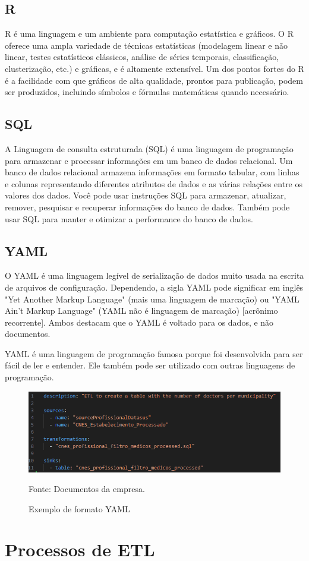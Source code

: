 \subsection{R}

R é uma linguagem e um ambiente para computação estatística e gráficos. O R oferece uma ampla variedade de técnicas estatísticas (modelagem linear e não linear, testes estatísticos clássicos, análise de séries temporais, classificação, clusterização, etc.) e gráficas, e é altamente extensível. Um dos pontos fortes do R é a facilidade com que gráficos de alta qualidade, prontos para publicação, podem ser produzidos, incluindo símbolos e fórmulas matemáticas quando necessário.\cite{r_project_about}

\subsection{SQL}

A Linguagem de consulta estruturada (SQL) é uma linguagem de programação para armazenar e processar informações em um banco de dados relacional. Um banco de dados relacional armazena informações em formato tabular, com linhas e colunas representando diferentes atributos de dados e as várias relações entre os valores dos dados. Você pode usar instruções SQL para armazenar, atualizar, remover, pesquisar e recuperar informações do banco de dados. Também pode usar SQL para manter e otimizar a performance do banco de dados.\cite{aws_what_is_sql}

\subsection{YAML}

O YAML é uma linguagem legível de serialização de dados muito usada na escrita de arquivos de configuração. Dependendo, a sigla YAML pode significar em inglês "Yet Another Markup Language" (mais uma linguagem de marcação) ou "YAML Ain’t Markup Language" (YAML não é linguagem de marcação) [acrônimo recorrente]. Ambos destacam que o YAML é voltado para os dados, e não documentos. 

YAML é uma linguagem de programação famosa porque foi desenvolvida para ser fácil de ler e entender. Ele também pode ser utilizado com outras linguagens de programação.\cite{redhat_what_is_yaml}

\begin{figure}[H]
  \centering
  \caption{Exemplo de formato YAML}\label{fig:yaml}
  \includegraphics[width=.6\linewidth]{imagens/yaml.png}
  \par
  \footnotesize{Fonte: Documentos da empresa.}
\end{figure}

\section{Processos de ETL}